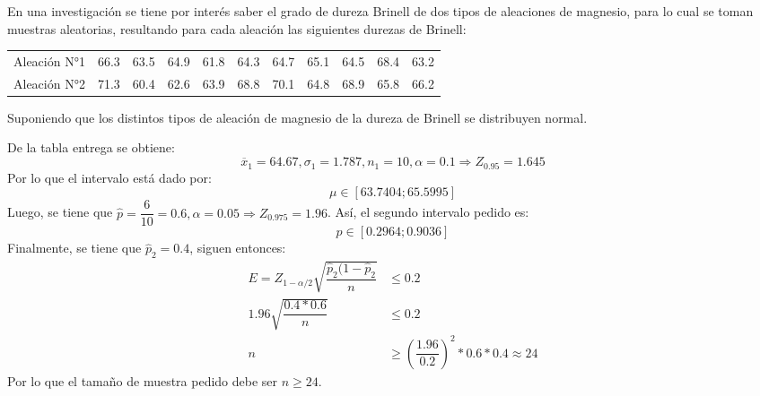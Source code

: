 

\addpoints

\question[14] En una investigación se tiene por interés saber el grado de dureza Brinell de dos tipos de aleaciones de magnesio, para lo cual se toman muestras aleatorias, resultando para cada aleación las siguientes durezas de Brinell:

\begin{table}[h!]
    \centering
    \begin{tabular}{lllllllllll}
    Aleación N°1 & 66.3 & 63.5 & 64.9 & 61.8 & 64.3 & 64.7 & 65.1 & 64.5 & 68.4 & 63.2 \\
    Aleación N°2 & 71.3 & 60.4 & 62.6 & 63.9 & 68.8 & 70.1 & 64.8 & 68.9 & 65.8 & 66.2
    \end{tabular}
\end{table}

Suponiendo que los distintos tipos de aleación de magnesio de la dureza de Brinell se distribuyen normal.

\noaddpoints
{}

\begin{solution}
    De la tabla entrega se obtiene: 
    $$\overline{x}_1=64.67,\sigma_1=1.787,n_1=10,\alpha=0.1 \Rightarrow Z_{0.95}=1.645$$
    Por lo que el intervalo está dado por:
    $$\mu \in \left[ 63.7404 ; 65.5995 \right]$$
    Luego, se tiene que $\hat{p}=\dfrac{6}{10}=0.6,\alpha=0.05\Rightarrow Z_{0.975}=1.96$. Así, el segundo intervalo pedido es:
    $$p \in \left[ 0.2964 ; 0.9036 \right]$$
    Finalmente, se tiene que $\hat{p}_2=0.4$, siguen entonces:
    \begin{align*}
        E = Z_{1-\alpha/2}\sqrt{\dfrac{\hat{p}_2 (1-\hat{p}_2}{n}} &\leq 0.2\\
        1.96 \sqrt{\dfrac{0.4*0.6}{n}} &\leq 0.2\\
        n &\geq \left(\dfrac{1.96}{0.2}\right)^2 * 0.6 * 0.4 \approx 24
    \end{align*}
Por lo que el tamaño de muestra pedido debe ser $n\geq 24$.
\end{solution}